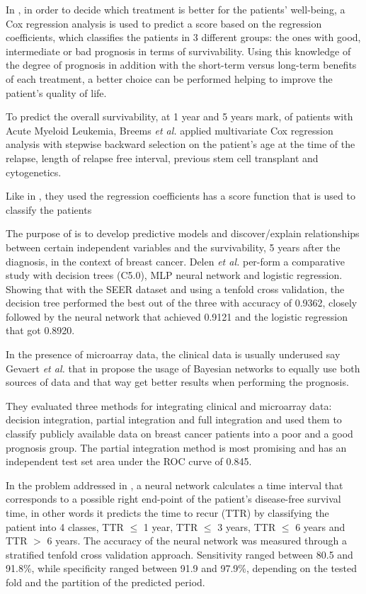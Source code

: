 In \cite{Steyerberg2005}, in order to decide which treatment is better for the patients’ well-being, a Cox regression analysis
 is used to predict a score based on the regression coefficients, which classifies the patients in 3 different groups: the ones
 with good, intermediate or bad prognosis in terms of survivability. Using this knowledge of the degree of prognosis in addition
 with the short-term versus long-term benefits of each treatment, a better choice can be performed helping to improve the patient’s quality of life. 

To predict the overall survivability, at 1 year and 5 years mark, of patients with Acute Myeloid Leukemia, Breems \emph{et al.} applied 
multivariate Cox regression analysis with stepwise backward selection on the patient’s age at the time of the relapse, length of relapse 
free interval, previous stem cell transplant and cytogenetics. 

Like in \cite{Steyerberg2005}, they used the regression coefficients has a score function that is used to classify the patients \cite{Breems2005}

The purpose of \cite{Delen2005} is to develop predictive models and discover/explain relationships between certain independent variables and the
 survivability, 5 years after the diagnosis, in the context of breast cancer. Delen \emph{et al.} per-form a comparative study with decision trees (C5.0),
 MLP neural network and logistic regression. Showing that with the SEER dataset and using a tenfold cross validation, the decision tree performed 
 the best out of the three with accuracy of 0.9362, closely followed by the neural network that achieved 0.9121 and the logistic regression that
 got 0.8920.

In the presence of microarray data, the clinical data is usually underused say Gevaert \emph{et al.} that in \cite{Gevaert2006} propose the usage of Bayesian 
networks to equally use both sources of data and that way get better results when performing the prognosis. 

They evaluated three methods for integrating clinical and microarray data: decision integration, partial integration and full integration 
and used them to classify publicly available data on breast cancer patients into a poor and a good prognosis group. The partial integration
 method is most promising and has an independent test set area under the ROC curve of 0.845.

In the problem addressed in \cite{Anagnostopoulos2006}, a neural network calculates a time interval that corresponds to a possible right
 end-point of the patient’s disease-free survival time, in other words it predicts the time to recur (TTR) by classifying the patient into 
 4 classes, TTR $\leq$ 1 year, TTR $\leq$ 3 years, TTR $\leq$ 6 years and TTR $>$ 6 years. The accuracy of the neural network was measured through a
 stratified tenfold cross validation approach. Sensitivity ranged between 80.5 and 91.8\%, while specificity ranged between 91.9 and 97.9\%,
 depending on the tested fold and the partition of the predicted period. 

